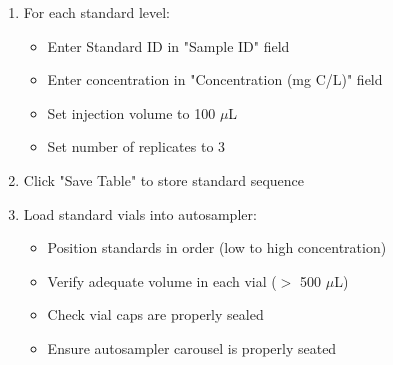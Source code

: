 \documentclass[11pt,a4paper]{article}\usepackage[]{graphicx}\usepackage[]{xcolor}
\begin{document}
\begin{enumerate}[noitemsep]
    \item For each standard level:
    \begin{itemize}
        \item Enter Standard ID in "Sample ID" field
        \item Enter concentration in "Concentration (mg C/L)" field
        \item Set injection volume to 100 $\mu$L
        \item Set number of replicates to 3
    \end{itemize}
    \item Click "Save Table" to store standard sequence
    \item Load standard vials into autosampler:
    \begin{itemize}
        \item Position standards in order (low to high concentration)
        \item Verify adequate volume in each vial ($>$ 500 $\mu$L)
        \item Check vial caps are properly sealed
        \item Ensure autosampler carousel is properly seated
    \end{itemize}
\end{enumerate}
\end{document}
